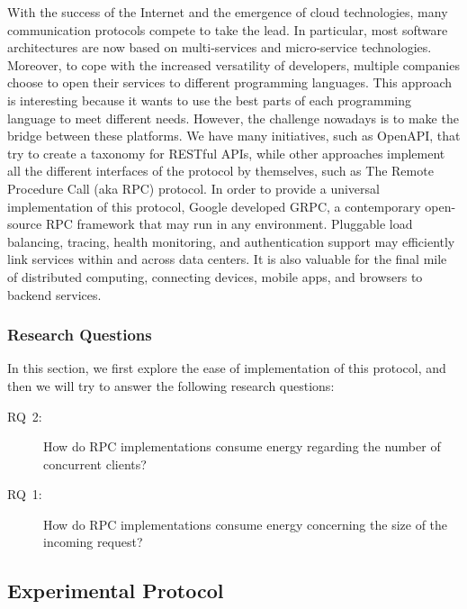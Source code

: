 
With the success of the Internet and the emergence of cloud technologies, many communication protocols compete to take the lead.
In particular, most software architectures are now based on multi-services and micro-service technologies.
Moreover, to cope with the increased versatility of developers, multiple companies choose to open their services to different programming languages.
This approach is interesting because it wants to use the best parts of each programming language to meet different needs.
However, the challenge nowadays is to make the bridge between these platforms.
We have many initiatives, such as OpenAPI, that try to create a taxonomy for RESTful APIs, while other approaches implement all the different interfaces of the protocol by themselves, such as The Remote Procedure Call (aka RPC) protocol.
In order to provide a universal implementation of this protocol, Google developed GRPC, a contemporary open-source RPC framework that may run in any environment. Pluggable load balancing, tracing, health monitoring, and authentication support may efficiently link services within and across data centers. It is also valuable for the final mile of distributed computing, connecting devices, mobile apps, and browsers to backend services.

\subsubsection{Research Questions}
In this section, we first explore the ease of implementation of this protocol, and then we will try to answer the following research questions:
\begin{description}
    \item[\textsc{RQ}~2:] How do RPC implementations consume energy regarding the number of concurrent clients?
    \item[\textsc{RQ}~1:] How do RPC implementations consume energy concerning the size of the incoming request?
\end{description}

\subsection{Experimental Protocol}

